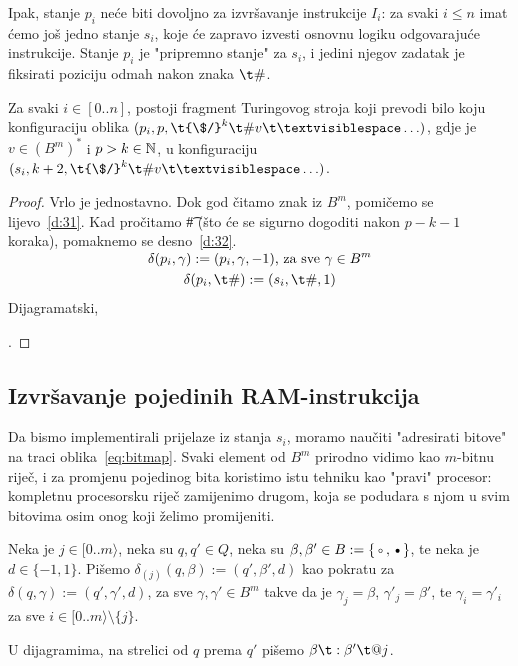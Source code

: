 Ipak, stanje $p_i$ neće biti dovoljno za izvršavanje instrukcije $I_i$: za svaki $i\le n$ imat ćemo još jedno stanje $s_i$, koje će zapravo izvesti osnovnu logiku odgovarajuće instrukcije. Stanje $p_i$ je "pripremno stanje" za $s_i$, i jedini njegov zadatak je fiksirati poziciju odmah nakon znaka $\t\#$.

\begin{lema}\label{lm:pi>si}
Za svaki $i\in[0..n]$, postoji fragment Turingovog stroja koji prevodi bilo koju konfiguraciju oblika $(p_i,p,\t{\$/}^k\t\#v\bl\ldots)$, gdje je $v\in(B^m)^*$ i $p>k\in{\mathbb N}$, u konfiguraciju $(s_i,k+2,\t{\$/}^k\t\#v\bl\ldots)$.
\end{lema}
\begin{proof}
Vrlo je jednostavno. Dok god čitamo znak iz $B^m$, pomičemo se lijevo~\eqref{d:31}. Kad pročitamo \t\# (što će se sigurno dogoditi nakon $p-k-1$ koraka), pomaknemo se desno~\eqref{d:32}.

\noindent\begin{gather}
\SwapAboveDisplaySkip
\label{d:31}
    \delta(p_i,\gamma):=(p_i,\gamma,-1)\text{, za sve }\gamma\in B^m\\
\label{d:32}
    \delta(p_i,\t\#):=(s_i,\t\#,1)
\end{gather}
Dijagramatski,
\;.
\end{proof}

\subsection{Izvršavanje pojedinih RAM-instrukcija}

Da bismo implementirali prijelaze iz stanja $s_i$, moramo naučiti "adresirati bitove" na traci oblika~\eqref{eq:bitmap}. Svaki element od $B^m$ prirodno vidimo kao $m$-bitnu riječ, i za promjenu pojedinog bita koristimo istu tehniku kao "pravi" procesor: kompletnu procesorsku riječ zamijenimo drugom, koja se podudara s njom u svim bitovima osim onog koji želimo promijeniti.

\begin{definicija}\label{def:trag}
Neka je $j\in[0..m\rangle$, neka su $q,q'\in Q$, neka su $\beta,\beta'\in B:=\{\text\textopenbullet,\text\textbullet\}$, te neka je $d\in\{-1,1\}$. Pišemo $\delta_{(j)}(q,\beta):=(q',\beta',d)$ kao pokratu za
$\delta(q,\gamma):=(q',\gamma',d)$\text,
za sve $\gamma,\gamma'\in B^m$ takve da je $\gamma_j=\beta$, $\gamma'_j=\beta'$, te $\gamma_i=\gamma'_i$ za sve $i\in[0..m\rangle\setminus\{j\}$.

U dijagramima, na strelici od $q$ prema $q'$ pišemo $\beta\t:\beta'\t@j$.
\end{definicija}

